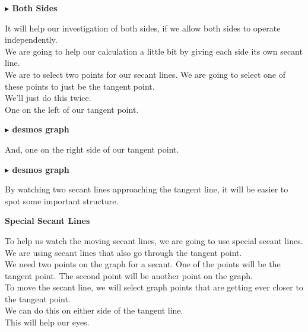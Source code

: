 \documentclass{ximera}
\begin{document}
\textbf{\textcolor{red!70!black}{$\blacktriangleright$ Both Sides}}

It will help our investigation of both sides, if we allow both sides to operate independently. \\


We are going to help our calculation a little bit by giving each side its own secant line.  \\


We are to select two points for our secant lines.  We are going to select one of these points to just be the tangent point. \\ 

We'll just do this twice. \\


One on the left of our tangent point.


\textbf{\textcolor{blue!55!black}{$\blacktriangleright$ desmos graph}} 
\begin{center}
\end{center}




And, one on the right side of our tangent point.


\textbf{\textcolor{blue!55!black}{$\blacktriangleright$ desmos graph}} 
\begin{center}
\end{center}



By watching two secant lines approaching the tangent line, it will be easier to spot some important structure. \\






\begin{idea}   \textbf{\textcolor{blue!55!black}{Special Secant Lines}}


To help us watch the moving secant lines, we are going to use special secant lines. \\

We are using secant lines that also go through the tangent point. \\

We need two points on the graph for a secant. One of the points will be the tangent point.  The second point will be another point on the graph. \\

To move the secant line, we will select graph points that are getting ever closer to the tangent point. \\

We can do this on either side of the tangent line. \\

This will help our eyes.


\end{idea}
\end{document}
